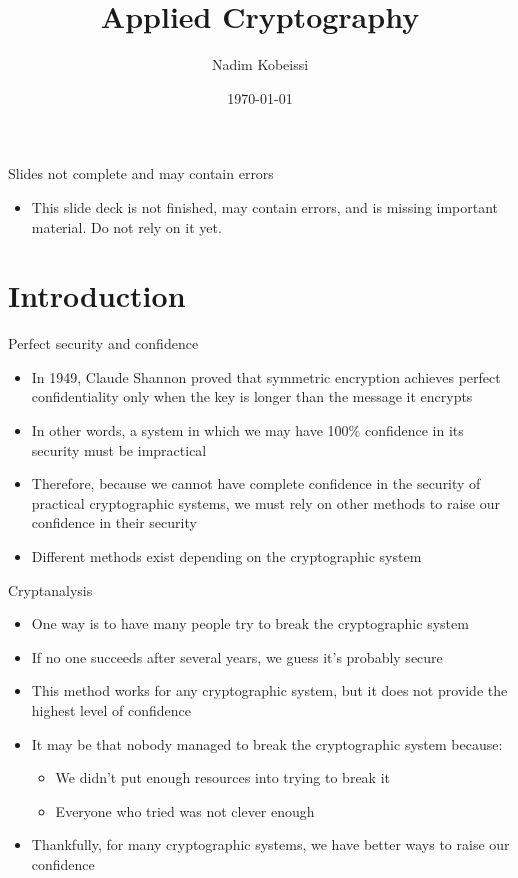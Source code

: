 \documentclass[aspectratio=169, lualatex, handout]{beamer}
\title{Applied Cryptography}
\author{Nadim Kobeissi}
\institute{American University of Beirut}
\date{\today}
\begin{document}
\begin{frame}[plain]
	\titlepage
\end{frame}

\begin{frame}{Slides not complete and may contain errors}
	\begin{itemize}
		\item This slide deck is not finished, may contain errors, and is missing important material. Do not rely on it yet.
	\end{itemize}
\end{frame}

\section{Introduction}

\begin{frame}{Perfect security and confidence}
	\begin{itemize}
		\item In 1949, Claude Shannon proved that symmetric encryption achieves perfect confidentiality only when the key is longer than the message it encrypts
		\item In other words, a system in which we may have 100\% confidence in its security must be impractical
		\item Therefore, because we cannot have complete confidence in the security of practical cryptographic systems, we must rely on other methods to raise our confidence in their security
		\item Different methods exist depending on the cryptographic system
	\end{itemize}
\end{frame}

\begin{frame}{Cryptanalysis}
	\begin{itemize}
		\item One way is to have many people try to break the cryptographic system
		\item If no one succeeds after several years, we guess it's probably secure
		\item This method works for any cryptographic system, but it does not provide the highest level of confidence
		\item It may be that nobody managed to break the cryptographic system because:
		      \begin{itemize}
			      \item We didn't put enough resources into trying to break it
			      \item Everyone who tried was not clever enough
		      \end{itemize}
		\item Thankfully, for many cryptographic systems, we have better ways to raise our confidence
	\end{itemize}
\end{frame}
\end{document}
